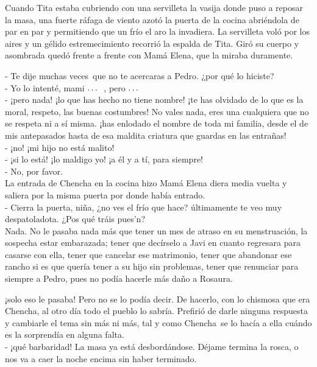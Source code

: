 Cuando Tita estaba cubriendo con una servilleta la vasija donde puso a
reposar la masa, una fuerte ráfaga de viento azotó la puerta de la
cocina abriéndola de par en par y permitiendo que un frío el aro la
invadiera. La servilleta voló por los aires y un gélido estremecimiento
recorrió la espalda de Tita. Giró su cuerpo y asombrada quedó frente a
frente con Mamá Elena, que la miraba duramente.


- Te dije muchas veces~que no te acercaras a Pedro. ¿por qué lo %
hiciste? %
\\- \ndots Yo lo intenté, mami $\ldots~$ , pero $\ldots~$  %
\\- ¡pero nada! ¡lo que has hecho no tiene nombre! ¡te has olvidado de lo %
que es la moral, respeto, las buenas costumbres! No vales nada, eres una %
cualquiera que no se respeta ni a sí misma. ¡has enlodado el nombre de %
toda mi familia, desde el de mis antepasados hasta de esa maldita %
criatura que guardas en las entrañas! %
\\- ¡no! ¡mi hijo no está malito! %
\\- ¡si lo está! ¡lo maldigo yo! ¡a él y a tí, para siempre! %
\\- No, por favor.\\

La entrada de Chencha en la cocina hizo Mamá Elena diera media vuelta y
saliera por la misma puerta por donde había entrado.
\\- Cierra la puerta, niña, ¿no ves el frío que hace? últimamente te veo %
muy despatoladota. ¿Pos qué tráis pues’n?\\

Nada. No le pasaba nada más que tener un mes de atraso en su
menstruación, la sospecha estar embarazada; tener que decírselo a Javi
en cuanto regresara para casarse con ella, tener que cancelar ese
matrimonio, tener que abandonar ese rancho si es que quería tener a su
hijo sin problemas, tener que renunciar para siempre a Pedro, pues no
podía hacerle más daño a Rosaura.

¡solo eso le pasaba! Pero no se lo podía decir. De hacerlo, con lo
chismosa que era Chencha, al otro día todo el pueblo lo sabría. Prefirió
de darle ninguna respuesta y cambiarle el tema sin más ni más, tal y
como Chencha~se lo hacía a ella cuándo es la sorprendía en alguna
falta.
\\- ¡qué barbaridad! La masa ya está desbordándose. %
Déjame termina la rosca, o nos va a caer la noche encima sin haber %
terminado.\\

